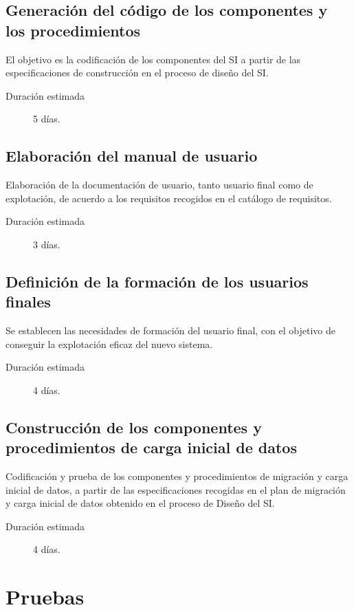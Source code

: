 \documentclass[11pt,a4paper,spanish,twoside]{report}
\begin{document}
\subsection{Generación del código de los componentes y los procedimientos}
El objetivo es la codificación de los componentes del SI a
  partir de las especificaciones de construcción en el proceso de diseño del SI.
\begin{description}
\item[Duración estimada] 5 días.
\end{description}

\subsection{Elaboración del manual de usuario}
Elaboración de la documentación de usuario, tanto usuario final como de
explotación, de acuerdo a los requisitos recogidos en el catálogo de
requisitos. 
\begin{description}
\item[Duración estimada] 3 días.
\end{description}

\subsection{Definición de la formación de los usuarios finales}
Se establecen las necesidades de formación del usuario final, con el objetivo
de conseguir la explotación eficaz del nuevo sistema. 
\begin{description}
\item[Duración estimada] 4 días.
\end{description}

\subsection{Construcción de los componentes y procedimientos de 
carga inicial de datos} 
Codificación y prueba de los componentes y procedimientos de migración y
carga inicial de datos, a partir de las especificaciones recogidas en el plan
de migración y carga inicial de datos obtenido en el proceso de Diseño del
SI. 
\begin{description}
\item[Duración estimada] 4 días.
\end{description}

\section{Pruebas}
\end{document}
